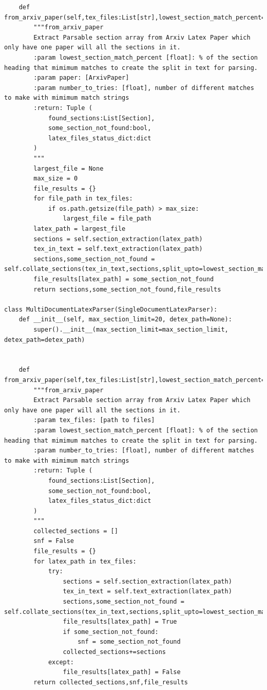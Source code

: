 \begin{lstlisting}
    def from_arxiv_paper(self,tex_files:List[str],lowest_section_match_percent=0.2,number_to_tries=10):
        """from_arxiv_paper 
        Extract Parsable section array from Arxiv Latex Paper which only have one paper will all the sections in it. 
        :param lowest_section_match_percent [float]: % of the section heading that mimimum matches to create the split in text for parsing. 
        :param paper: [ArxivPaper]
        :param number_to_tries: [float], number of different matches to make with mimimum match strings
        :return: Tuple (
            found_sections:List[Section],
            some_section_not_found:bool,
            latex_files_status_dict:dict
        ) 
        """
        largest_file = None
        max_size = 0
        file_results = {}
        for file_path in tex_files:
            if os.path.getsize(file_path) > max_size:
                largest_file = file_path
        latex_path = largest_file
        sections = self.section_extraction(latex_path)
        tex_in_text = self.text_extraction(latex_path)
        sections,some_section_not_found = self.collate_sections(tex_in_text,sections,split_upto=lowest_section_match_percent,split_bins=number_to_tries)
        file_results[latex_path] = some_section_not_found
        return sections,some_section_not_found,file_results

class MultiDocumentLatexParser(SingleDocumentLatexParser):
    def __init__(self, max_section_limit=20, detex_path=None):
        super().__init__(max_section_limit=max_section_limit, detex_path=detex_path)
    

    def from_arxiv_paper(self,tex_files:List[str],lowest_section_match_percent=0.2,number_to_tries=10):
        """from_arxiv_paper 
        Extract Parsable section array from Arxiv Latex Paper which only have one paper will all the sections in it. 
        :param tex_files: [path to files]
        :param lowest_section_match_percent [float]: % of the section heading that mimimum matches to create the split in text for parsing. 
        :param number_to_tries: [float], number of different matches to make with mimimum match strings
        :return: Tuple (
            found_sections:List[Section],
            some_section_not_found:bool,
            latex_files_status_dict:dict
        ) 
        """
        collected_sections = []
        snf = False
        file_results = {}
        for latex_path in tex_files:
            try:
                sections = self.section_extraction(latex_path)
                tex_in_text = self.text_extraction(latex_path)
                sections,some_section_not_found = self.collate_sections(tex_in_text,sections,split_upto=lowest_section_match_percent,split_bins=number_to_tries)
                file_results[latex_path] = True
                if some_section_not_found:
                    snf = some_section_not_found
                collected_sections+=sections
            except:
                file_results[latex_path] = False
        return collected_sections,snf,file_results


\end{lstlisting}
